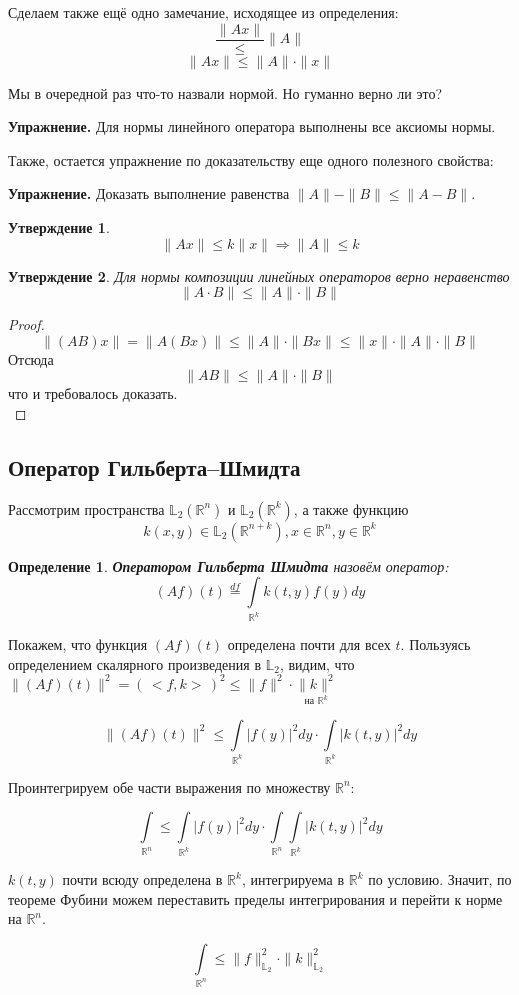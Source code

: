 \documentclass[12pt]{article}
\newcommand{\exc}{{\bfseries Упражнение. }}
\newcommand{\norm}[1]{\| #1 \|}
\newcommand{\scal}[2]{\, < \!\! #1, #2 \!\! > \,}
\renewcommand{\leq}{\leqslant}
\newtheorem{defi}{Определение}[section]
\newtheorem{state}{Утверждение}[section] %
\begin{document}
	Сделаем также ещё одно замечание, исходящее из определения:
	$$ \frac{\norm{Ax}} \leq \norm{A} $$
	$$ \norm{Ax} \leq \norm{A} \cdot \norm{x} $$
	
	Мы в очередной раз что-то назвали нормой. Но {\color{gray}гуманно} верно ли это?
	
	\exc Для нормы линейного оператора выполнены все аксиомы нормы.
	
	Также, остается упражнение по доказательству еще одного полезного свойства:
	
	\exc Доказать выполнение равенства $\norm{A} - \norm{B} \leq \norm{A-B}$.
	
	\begin{state}
		$$\norm{Ax} \leq k \norm{x} \Rightarrow \norm{A} \leq k$$
	\end{state}
	
	\begin{state}
		Для нормы композиции линейных операторов верно неравенство 
		$$\norm{A\cdot B} \leq \norm{A} \cdot \norm{B}$$
	\end{state}
	\begin{proof}
		$$ \norm{(AB)x} = \norm{A(Bx)} \leq \norm{A} \cdot \norm{Bx} \leq \norm{x} \cdot \norm{A} \cdot \norm{B} $$
		Отсюда 
		$$ \norm{AB} \leq \norm{A} \cdot \norm{B} $$
		что и требовалось доказать. \\
	\end{proof}
	
	\subsection*{Оператор Гильберта--Шмидта}
	Рассмотрим пространства $\mathbb{L}_2(\mathbb{R}^n)$ и $\mathbb{L}_2(\mathbb{R}^k)$, а также функцию
	$$ k(x,y) \in \mathbb{L}_2(\mathbb{R}^{n+k}), x \in \mathbb{R}^n, y \in \mathbb{R}^k$$
	
	\begin{defi}
		\textbf{Оператором Гильберта Шмидта} назовём оператор:
		$$ (Af)(t) \overset{df}{=} \underset{\mathbb{R}^k}{\int} k(t,y) f(y) dy $$
	\end{defi}
	
	Покажем, что функция $(Af)(t)$ определена почти для всех $t$. Пользуясь определением скалярного произведения в $\mathbb{L}_2$, 
	видим, что $\norm{(Af)(t)}^2 = (\scal{f}{k})^2 \leq \norm{f}^2 \cdot \underset{\text{на }\mathbb{R}^k}{\norm{k}^2}$
	
	$$ \norm{(Af)(t)}^2 \leq \underset{\mathbb{R}^k}{\int} |f(y)|^2 dy \cdot \underset{\mathbb{R}^k}{\int} |k(t,y)|^2 dy $$
	
	Проинтегрируем обе части выражения по множеству $\mathbb{R}^n$:
	
	$$ \underset{\mathbb{R}^n}{\int} \leq \underset{\mathbb{R}^k}{\int} |f(y)|^2 dy 
	   \cdot \underset{\mathbb{R}^n}{\int} \underset{\mathbb{R}^k}{\int} |k(t,y)|^2 dy $$
	
	$k(t,y)$ почти всюду определена в $\mathbb{R}^k$, интегрируема
	в $\mathbb{R}^k$ по условию. Значит, по теореме Фубини можем переставить пределы интегрирования 
	и перейти к норме на $\mathbb{R}^n$.
	
	$$ \underset{\mathbb{R}^n}{\int} \leq \norm{f}^2_{\mathbb{L}_2} \cdot \norm{k}^2_{\mathbb{L}_2} $$
\end{document}
